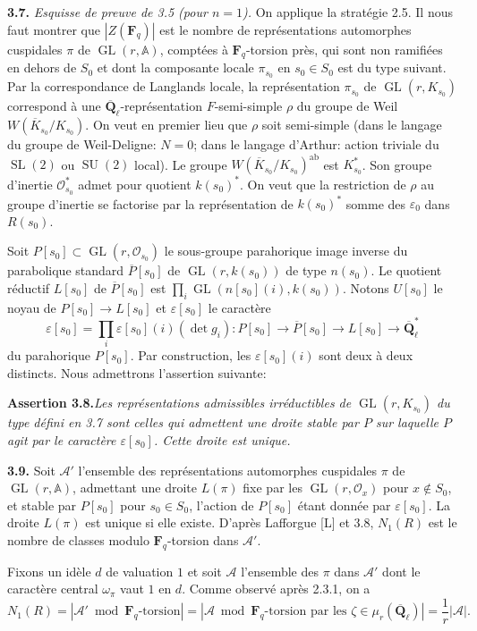\documentclass[11pt]{article}
\newcommand{\Fq}{\mathbf{F}_q}
\newcommand{\Qbl}{\overline{\mathbf{Q}}_{\ell}}
\newcommand{\GL}{\operatorname{GL}}
\newcommand{\Acal}{\mathcal{A}}
\newcommand{\Adele}{\mathbb{A}}
\newcommand{\SL}{\operatorname{SL}}
\newcommand{\SU}{\operatorname{SU}}
\newcommand{\para}[1]{\medskip\noindent\textbf{#1}\enspace}
\begin{document}
\para{3.7.} \textit{Esquisse de preuve de 3.5 (pour \(n=1\)).} On applique la stratégie 2.5. Il nous faut montrer que \(|Z(\Fq)|\) est le nombre de représentations automorphes cuspidales \(\pi\) de \(\GL(r,\Adele)\), comptées à \(\Fq\)-torsion près, qui sont non ramifiées en dehors de \(S_0\) et dont la composante locale \(\pi_{s_0}\) en \(s_0\in S_0\) est du type suivant. Par la correspondance de Langlands locale, la représentation \(\pi_{s_0}\) de \(\GL(r,K_{s_0})\) correspond à une \(\Qbl\)-représentation \(F\)-semi-simple \(\rho\) du groupe de Weil \(W(\overline K_{s_0}/K_{s_0})\). On veut en premier lieu que \(\rho\) soit semi-simple (dans le langage du groupe de Weil-Deligne: \(N=0\); dans le langage d'Arthur: action triviale du \(\SL(2)\) ou \(\SU(2)\) local). Le groupe \(W(\overline K_{s_0}/K_{s_0})^{\mathrm{ab}}\) est \(K_{s_0}^*\). Son groupe d'inertie \(\mathcal O_{s_0}^*\) admet pour quotient \(k(s_0)^*\). On veut que la restriction de \(\rho\) au groupe d'inertie se factorise par la représentation de \(k(s_0)^*\) somme des \(\varepsilon_0\) dans \(R(s_0)\).

Soit \(P[s_0]\subset \GL(r,\mathcal O_{s_0})\) le sous-groupe parahorique image inverse du parabolique standard \(\overline P[s_0]\) de \(\GL(r,k(s_0))\) de type \(n(s_0)\). Le quotient réductif \(L[s_0]\) de \(\overline P[s_0]\) est \(\prod_i\GL(n[s_0](i),k(s_0))\). Notons \(U[s_0]\) le noyau de \(P[s_0]\to L[s_0]\) et \(\varepsilon[s_0]\) le caractère
\[
  \varepsilon[s_0]=\prod_i\varepsilon[s_0](i)(\det g_i):P[s_0]\to\overline P[s_0]\to L[s_0]\to\Qbl^*
\]
du parahorique \(P[s_0]\). Par construction, les \(\varepsilon[s_0](i)\) sont deux à deux distincts. Nous admettrons l'assertion suivante:

\noindent\textbf{Assertion 3.8.}\quad\textit{Les représentations admissibles irréductibles de \(\GL(r,K_{s_0})\) du type défini en 3.7 sont celles qui admettent une droite stable par \(P\) sur laquelle \(P\) agit par le caractère \(\varepsilon[s_0]\). Cette droite est unique.}

\para{3.9.} Soit \(\Acal'\) l'ensemble des représentations automorphes cuspidales \(\pi\) de \(\GL(r,\Adele)\), admettant une droite \(L(\pi)\) fixe par les \(\GL(r,\mathcal O_x)\) pour \(x\notin S_0\), et stable par \(P[s_0]\) pour \(s_0\in S_0\), l'action de \(P[s_0]\) étant donnée par \(\varepsilon[s_0]\). La droite \(L(\pi)\) est unique si elle existe. D'après Lafforgue [L] et 3.8, \(N_1(R)\) est le nombre de classes modulo \(\Fq\)-torsion dans \(\Acal'\).

Fixons un idèle \(d\) de valuation \(1\) et soit \(\Acal\) l'ensemble des \(\pi\) dans \(\Acal'\) dont le caractère central \(\omega_\pi\) vaut \(1\) en \(d\). Comme observé après 2.3.1, on a
\begin{equation}
  N_1(R)=|\Acal'\bmod \Fq\text{-torsion}|=|\Acal\bmod \Fq\text{-torsion par les }\zeta\in\mu_r(\Qbl)|=\frac{1}{r}|\Acal|.
\tag{3.9.1}
\end{equation}
\end{document}
